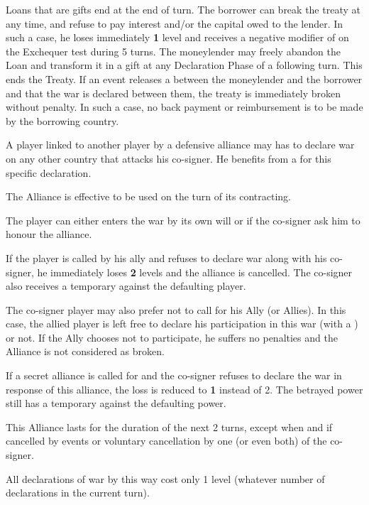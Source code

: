 Loans that are gifts end at the end of turn.
\bparag The borrower can break the treaty at any time, and refuse to pay
interest and/or the capital owed to the lender. In such a case, he loses
immediately {\bf 1} \STAB level and receives a negative modifier
of  on the Exchequer test during 5 turns.
\bparag The moneylender may freely abandon the Loan and transform it in a gift
at any Declaration Phase of a following turn. This ends the Treaty.
\bparag If an event releases a \CB between the moneylender and the borrower
and that the war is declared between them, the treaty is immediately broken
without penalty. In such a case, no back payment or reimbursement is to be
made by the borrowing country.

\label{chDiplo:Alliance:Defensive Alliance}
A player linked to another player by a defensive alliance may has to declare
war on any other country that attacks his co-signer. He benefits from a \CB
for this specific declaration.

\bparag The Alliance is effective to be used on the turn of its contracting.

\bparag The player can either enters the war by its own will or if the
co-signer ask him to honour the alliance.

\bparag If the player is called by his ally and refuses to declare war along
with his co-signer, he immediately loses {\bf 2} \STAB levels and the alliance
is cancelled. The co-signer also receives a temporary \CB against the
defaulting player.

\bparag The co-signer player may also prefer not to call for his Ally (or
Allies). In this case, the allied player is left free to declare his
participation in this war (with a \CB) or not. If the Ally chooses not to
participate, he suffers no penalties and the Alliance is not considered as
broken.

\bparag If a secret alliance is called for and the co-signer refuses to
declare the war in response of this alliance, the loss is reduced to {\bf 1}
\STAB instead of 2. The betrayed power still has a temporary \CB against the
defaulting power.

\bparag This Alliance lasts for the duration of the next 2 turns, except when
and if cancelled by events or voluntary cancellation by one (or even both) of
the co-signer.

\bparag All declarations of war by this way cost only 1 \STAB level (whatever
number of declarations in the current turn).

